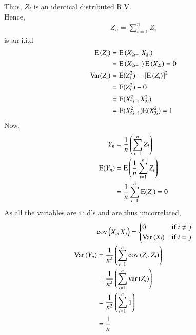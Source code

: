 \documentclass[journal,12pt,Twocolumn]{IEEEtran}
\theoremstyle{remark}
\begin{document}
Thus, $Z_i$ is an identical distributed R.V. \\
Hence,
\begin{align} Z_n=\sum_{i=1}^{n}Z_i 
\end{align} is an i.i.d 
\begin{align}
\text{E}\left(Z_i\right)&=\text{E}\left(X_{2i-1}X_{2i}\right) \\
&=\text{E}\left(X_{2i-1}\right)\text{E}\left(X_{2i}\right) = 0 \\
\text{Var}(Z_i)&=\text{E}(Z_i^2)-{}\left[\text{E}\left(Z_i\right)\right]^2 \\
&=\text{E}(Z_i^2)-0 \\ 
&=\text{E}(X_{2i-1}^2X_{2i}^2) \\
&=\text{E}(X_{2i-1}^2)\text{E}(X_{2i}^2) = 1  
\end{align}
Now,
\begin{align}
Y_n&=\frac{1}{n}\left(\sum_{i=1}^{n} Z_i\right) \\
\text{E}(Y_n)&=\text{E}\left(\frac{1}{n}\sum_{i=1}^{n} Z_i\right) \\
&= \frac{1}{n}\sum_{i=1}^{n} \text{E}(Z_i) = 0 
\end{align}
As all the variables are i.i.d's and are thus uncorrelated,
\begin{align}
&\text{cov}\left(X_i, X_j\right) =
\begin{cases}
	0 & \text{if } i \ne j\\
    \text{Var}\left(X_i\right) & \text{if } i = j
\end{cases} \\
\text{Var}\left(Y_n\right)&=\frac{1}{n^2}\left(\sum_{i=1}^{n}\text{cov}\left(Z_i, Z_i\right)\right)\\
&= \frac{1}{n^2} \left(\sum_{i=1}^{n} \text{var}\left(Z_i\right)\right)\\
&= \frac{1}{n^2} \left(\sum_{i=1}^{n} 1\right)\\
&= \frac{1}{n}
\end{align}
\end{document}
